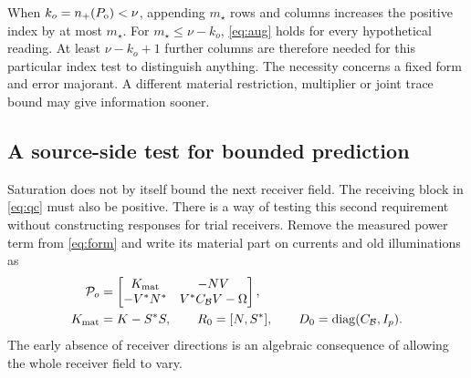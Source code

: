 When $k_o=n_+(P_{\mathrm o})<\nu$, appending $m_\star$ rows and columns increases the positive index by at most $m_\star$. For $m_\star\leq\nu-k_o$, \eqref{eq:aug} holds for every hypothetical reading. At least $\nu-k_o+1$ further columns are therefore needed for this particular index test to distinguish anything. The necessity concerns a fixed form and error majorant. A different material restriction, multiplier or joint trace bound may give information sooner.

\subsection{A source-side test for bounded prediction}\label{sec:sourceindex}
Saturation does not by itself bound the next receiver field. The receiving block in \eqref{eq:qc} must also be positive. There is a way of testing this second requirement without constructing responses for trial receivers. Remove the measured power term from \eqref{eq:form} and write its material part on currents and old illuminations as
\begin{align}
 \mathcal P_o&=
 \begin{bmatrix}K_{\rm mat}&-N V\\-V^*N^*&V^*C_{\mathcal B}V-\Omega\end{bmatrix},
\notag\\
 K_{\rm mat}&=K-S^*S,\qquad R_0=[N,S^*],\qquad D_0=\operatorname{diag}(C_{\mathcal B},I_p).
 \label{eq:sourceform}
\end{align}
The early absence of receiver directions is an algebraic consequence of allowing the whole receiver field to vary.

